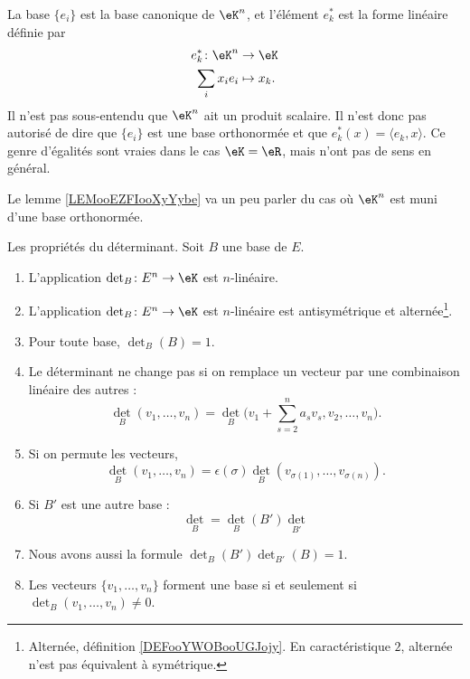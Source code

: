 \begin{normaltext}
	La base \( \{ e_i \}\) est la base canonique de \( \eK^n\), et l'élément \( e_k^*\) est la forme linéaire définie par
	\begin{equation}
		\begin{aligned}
			e_k^*\colon \eK^n & \to \eK      \\
			\sum_ix_ie_i      & \mapsto x_k.
		\end{aligned}
	\end{equation}
	Il n'est pas sous-entendu que \( \eK^n\) ait un produit scalaire. Il n'est donc pas autorisé de dire que \( \{ e_i \}\) est une base orthonormée et que \( e^*_k(x)=\langle e_k, x\rangle \). Ce genre d'égalités sont vraies dans le cas \( \eK=\eR\), mais n'ont pas de sens en général.

	Le lemme \ref{LEMooEZFIooXyYybe} va un peu parler du cas où \( \eK^n\) est muni d'une base orthonormée.
\end{normaltext}

\begin{lemma}     \label{LemJMWCooELZuho}
	Les propriétés du déterminant. Soit \( B\) une base de \( E\).
	\begin{enumerate}
		\item\label{ITEMooAHOHooDZgtSB}
		      L'application \( \det_B\colon E^n\to \eK\) est \( n\)-linéaire.
		\item\label{ITEMooTXXBooBmDtzd}
		      L'application \( \det_B\colon E^n\to \eK\) est \( n\)-linéaire est antisymétrique et alternée\footnote{Alternée, définition \ref{DEFooYWOBooUGJojy}. En caractéristique \( 2\), alternée n'est pas équivalent à symétrique.}.
		\item   \label{ITEMooNFJTooTqGoPr}
		      Pour toute base, \( \det_B(B)=1\).
		\item   \label{ITEMooALRQooDvBzDQ}
		      Le déterminant ne change pas si on remplace un vecteur par une combinaison linéaire des autres :
		      \begin{equation}
			      \det_B(v_1,\ldots, v_n)=\det_B\big( v_1+\sum_{s=2}^na_sv_s,v_2,\ldots, v_n \big).
		      \end{equation}
		\item   \label{ITEMooQTTRooMbzqyW}
		      Si on permute les vecteurs,
		      \begin{equation}
			      \det_B(v_1,\ldots, v_n)=\epsilon(\sigma)\det_B(v_{\sigma(1)},\ldots, v_{\sigma(n)}).
		      \end{equation}
		\item   \label{ITEMooIPIDooTrerVF}
		      Si \( B'\) est une autre base :
		      \begin{equation}        \label{EqAWICooBLTTOY}
			      \det_B=\det_B(B')\det_{B'}
		      \end{equation}
		\item   \label{ITEMooXKTAooXynFTE}
		      Nous avons aussi la formule \( \det_{B}(B')\det_{B'}(B)=1\).
		\item\label{ItemDWFLooDUePAf}
		      Les vecteurs \( \{ v_1,\ldots, v_n \}\) forment une base si et seulement si \( \det_B(v_1,\ldots, v_n)\neq 0\).
	\end{enumerate}
\end{lemma}

